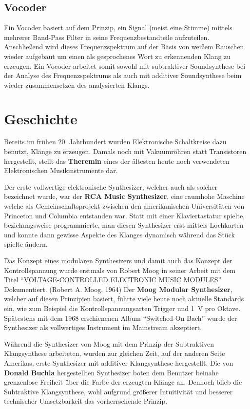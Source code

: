\subsection{Vocoder}
\label{sec:orga99ba24}
Ein Vocoder basiert auf dem Prinzip, ein Signal (meist eine Stimme) mittels mehrerer Band-Pass Filter in seine Frequenzbestandteile aufzuteilen. Anschließend wird dieses Frequenzspektrum auf der Basis von weißem Rauschen wieder aufgebaut um einen als gesprochenes Wort zu erkennenden Klang zu erzeugen. Ein Vocoder arbeitet somit sowohl mit subtraktiver Soundsynthese bei der Analyse des Frequenzspektrums als auch mit additiver Soundsynthese beim wieder zusammensetzen des analysierten Klangs.

\section{Geschichte}
\label{sec:orgcb898b5}
Bereits im frühen 20. Jahrhundert wurden Elektronische Schaltkreise dazu benutzt, Klänge zu erzeugen. Damals noch mit Vakuumröhren statt Transistoren hergestellt, stellt das \textbf{Theremin} eines der ältesten heute noch verwendeten Elektronischen Musikinstrumente dar.

Der erste vollwertige elektronische Synthesizer, welcher auch als solcher bezeichnet wurde, war der \textbf{RCA Music Synthesizer}, eine raumhohe Maschine welche als Gemeinschaftsprojekt zwischen den amerikanischen Universitäten von Princeton und Columbia entstanden war. Statt mit einer Klaviertastatur spielte, beziehungsweise programmierte, man diesen Synthesizer erst mittels Lochkarten und konnte dann gewisse Aspekte des Klanges dynamisch während das Stück spielte ändern.

Das Konzept eines modularen Synthesizers und damit auch das Konzept der Kontrollspannung wurde erstmals von Robert Moog in seiner Arbeit mit dem Titel "`VOLTAGE-CONTROLLED ELECTRONIC MUSIC MODULES"' Dokumentiert. (Robert A. Moog, 1964) Der \textbf{Moog Modular Synthesizer}, welcher auf diesen Prinzipien basiert, führte viele heute noch aktuelle Standards ein, wie zum Beispiel die Kontrollspannungsarten Trigger und \SI{1}{\volt} pro Oktave. Spätestens mit dem 1968 erschienenen Album "`Switched-On Bach"' wurde der Synthesizer als vollwertiges Instrument im Mainstream akzeptiert.

Während die Synthesizer von Moog mit dem Prinzip der Subtraktiven Klangsynthese arbeiteten, wurden zur gleichen Zeit, auf der anderen Seite Amerikas, erste Synthesizer mit additiver Klangsynthese hergestellt. Die von \textbf{Donald Buchla} hergestellten Synthesizer boten dem Benutzer beinahe grenzenlose Freiheit über die Farbe der erzeugten Klänge an. Dennoch blieb die Subtraktive Klangsynthese, wohl aufgrund größerer Intuitivität und besserer technischer Umsetzbarkeit das vorherrschende Prinzip.

